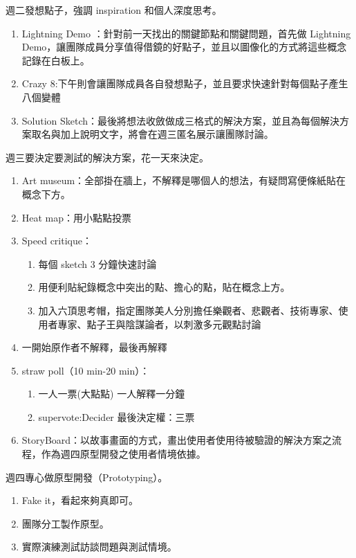 \documentclass[12pt,a4paper]{article}
\begin{document}
\begin{enumerate}
週二發想點子，強調 inspiration 和個人深度思考。

\begin{enumerate}
\item Lightning Demo ：針對前一天找出的關鍵節點和關鍵問題，首先做 Lightning Demo，讓團隊成員分享值得借鏡的好點子，並且以圖像化的方式將這些概念記錄在白板上。
\item Crazy 8:下午則會讓團隊成員各自發想點子，並且要求快速針對每個點子產生八個變體
\item Solution Sketch：最後將想法收斂做成三格式的解決方案，並且為每個解決方案取名與加上說明文字，將會在週三匿名展示讓團隊討論。
\end{enumerate}

週三要決定要測試的解決方案，花一天來決定。

\begin{enumerate}
\item Art museum：全部掛在牆上，不解釋是哪個人的想法，有疑問寫便條紙貼在概念下方。
\item Heat map：用小點點投票
\item Speed critique：
\begin{enumerate}
\item 每個 sketch 3 分鐘快速討論
\item 用便利貼紀錄概念中突出的點、擔心的點，貼在概念上方。
\item 加入六頂思考帽，指定團隊美人分別擔任樂觀者、悲觀者、技術專家、使用者專家、點子王與陰謀論者，以刺激多元觀點討論
\end{enumerate}
\item 一開始原作者不解釋，最後再解釋
\item straw poll（10 min-20 min）：
\begin{enumerate}
\item 一人一票(大點點) 一人解釋一分鐘
\item supervote:Decider 最後決定權：三票
\end{enumerate}
\item StoryBoard：以故事畫面的方式，畫出使用者使用待被驗證的解決方案之流程，作為週四原型開發之使用者情境依據。
\end{enumerate}

週四專心做原型開發（Prototyping）。

\begin{enumerate}
\item Fake it，看起來夠真即可。
\item 團隊分工製作原型。
\item 實際演練測試訪談問題與測試情境。
\end{enumerate}


\end{enumerate}
\end{document}
